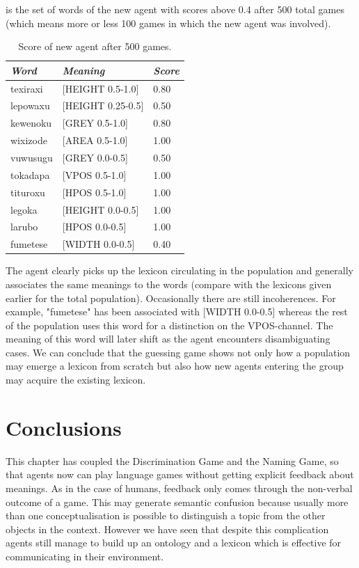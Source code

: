  is the set of words of the new agent
with scores above 0.4 after 
500 total games (which means more or less 100 games 
in which the new agent was involved). 
\begin{table}
\begin{center}
\begin{tabular}{ l  l  l }
\lsptoprule
{\it Word} & {\it Meaning} & {\it Score} \\ \midrule
texiraxi &  [HEIGHT 0.5-1.0] & 0.80 \\ \midrule
lepowaxu &  [HEIGHT 0.25-0.5] & 0.50 \\ \midrule
kewenoku &  [GREY 0.5-1.0] & 0.80 \\ \midrule
wixizode & [AREA 0.5-1.0] & 1.00 \\ \midrule
vuwusugu & [GREY 0.0-0.5] & 0.50 \\ \midrule
tokadapa &  [VPOS 0.5-1.0] & 1.00 \\ \midrule
tituroxu &  [HPOS 0.5-1.0] & 1.00 \\ \midrule
legoka   &  [HEIGHT 0.0-0.5] & 1.00 \\ \midrule
larubo   &  [HPOS 0.0-0.5] & 1.00 \\ \midrule
fumetese &  [WIDTH 0.0-0.5] & 0.40 \\ \midrule
\end{tabular}
\caption{\label{tab:newagents} Score of new agent after 500 games.}
\end{center}
\end{table}
The agent clearly picks up the lexicon circulating
in the population and generally associates the 
same meanings to the words (compare with the 
lexicons given earlier for the total population). 
Occasionally there are still incoherences. For example, 
"fumetese" has been associated with [WIDTH 0.0-0.5] 
whereas the rest of the population uses this word
for a distinction on the VPOS-channel. The meaning
of this word will later shift as the agent encounters
disambiguating cases. We can conclude that the 
guessing game shows not only how a population may 
emerge a lexicon from scratch but also how new 
agents entering the group may acquire the existing 
lexicon.  

\section{Conclusions}

This chapter has coupled the Discrimination Game and 
the Naming Game, so that agents now can play language
games without getting explicit feedback about meanings. 
As in the case of humans, feedback only comes through 
the non-verbal outcome of a game. 
This may generate semantic confusion
because usually more than one conceptualisation is 
possible to distinguish a topic from the other objects
in the context. However we have seen that despite
this complication agents still manage to build up 
an ontology and a lexicon which is effective for 
communicating in their environment. 

